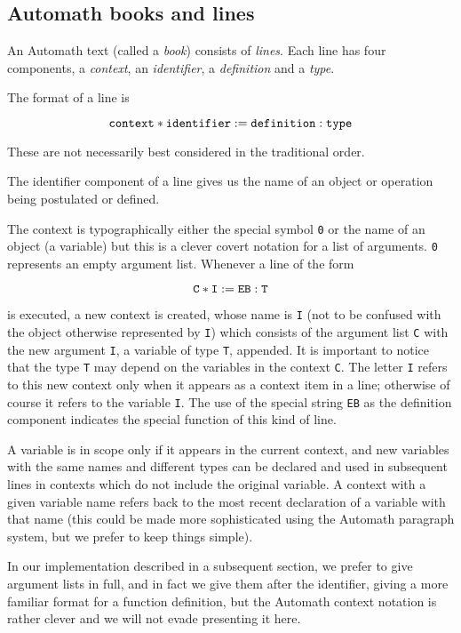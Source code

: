\documentclass[12pt]{article}
\begin{document}
\subsection{Automath books and lines}

An Automath text (called a {\em book\/}) consists of {\em lines}.   Each line has four components, a {\em context}, an {\em identifier}, a {\em definition} and a {\em type}.

The format of a line is

$${\tt context * identifier := definition : type}$$

These are not necessarily best considered in the traditional order.

The identifier component of a line gives us the name of an object or operation being postulated or defined.  

The context is typographically either the special symbol {\tt 0} or the name of an object (a variable) but this is a clever covert notation for a list of arguments.  {\tt 0}
represents an empty argument list.   Whenever a line of the form

$${\tt C * I := EB : T}$$

is executed, a new context is created, whose name is {\tt I} (not to be confused with the object  otherwise represented by {\tt I}) which consists of the argument
list {\tt C} with the new argument {\tt I}, a variable of type {\tt T}, appended.  It is important to notice that the type {\tt T} may depend on the variables in the context {\tt C}.  The letter {\tt I} refers to this new context only when it appears as a context item in a line;
otherwise of course it refers to the variable {\tt I}.  The use of the special string {\tt EB} as the definition component indicates the special function of this kind of line.

A variable is in scope only if it appears in the current context, and new variables with the same names and different types can be declared and used in subsequent lines in 
contexts which do not include the original variable.  A context with a given variable name refers back to the most recent declaration of a variable with that name (this could be
made more sophisticated using the Automath paragraph system, but we prefer to keep things simple).

In our implementation described in a subsequent section, we prefer to give argument lists in full, and in fact we give them after the identifier, giving a more familiar format for a function definition, but the Automath context notation is rather clever and we will not evade presenting it here.
\end{document}
